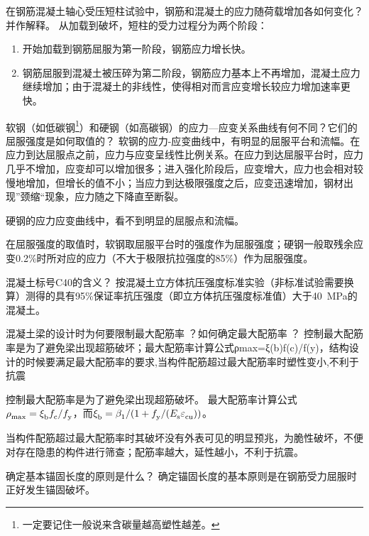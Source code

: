 \documentclass{article}
\begin{document}
\begin{questionList}
      \item 在钢筋混凝土轴心受压短柱试验中，钢筋和混凝土的应力随荷载增加各如何变化？并作解释。
      \ans 从加载到破坏，短柱的受力过程分为两个阶段：
      \begin{enumerate}
            \item 开始加载到钢筋屈服为第一阶段，钢筋应力增长快。
            \item ​钢筋屈服到混凝土被压碎为第二阶段，钢筋应力基本上不再增加，混凝土应力继续增加；由于混凝土的非线性，使得相对而言应变增长较应力增加速率更快。
      \end{enumerate}
      \item 软钢（如低碳钢\footnote{一定要记住一般说来含碳量越高塑性越差。}）和硬钢（如高碳钢）的应力—应变关系曲线有何不同？它们的屈服强度是如何取值的？
      \ans 软钢的应力-应变曲线中，有明显的屈服平台和流幅。在应力到达屈服点之前，应力与应变呈线性比例关系。在应力到达屈服平台时，应力几乎不增加，应变却可以增加很多；进入强化阶段后，应变增大，应力也会相对较慢地增加，但增长的值不小；当应力到达极限强度之后，应变迅速增加，钢材出现”颈缩“现象，应力随之下降直至断裂。
      \par 硬钢的应力应变曲线中，看不到明显的屈服点和流幅。
      \par 在屈服强度的取值时，软钢取屈服平台时的强度作为屈服强度；硬钢一般取残余应变0.2\%时所对应的应力（不大于极限抗拉强度的85\%）作为屈服强度。
      \item 混凝土标号C40的含义？
      \ans 按混凝土立方体抗压强度标准实验（非标准试验需要换算）测得的具有95\%保证率抗压强度（即立方体抗压强度标准值）大于\SI{40}{\MPa}的混凝土。
      \item 混凝土梁的设计时为何要限制最大配筋率 ？如何确定最大配筋率 ？
      \ans 控制最大配筋率是为了避免梁出现超筋破坏；最大配筋率计算公式ρmax=ξ(b)f(c)/f(y)，结构设计的时候要满足最大配筋率的要求,当构件配筋超过最大配筋率时塑性变小,不利于抗震
      \item 控制最大配筋率是为了避免梁出现超筋破坏。
      \ans 最大配筋率计算公式$\script{\rho}{max} = \script{\xi}{b} \script{f}{c} / \script{f}{y}$，而$\script{\xi}{b} = \script{\beta}{1}/(1+\script{f}{y}/(\script{E}{s}\script{\varepsilon}{cu}))$。
      \par 当构件配筋超过最大配筋率时其破坏没有外表可见的明显预兆，为脆性破坏，不便对存在隐患的构件进行筛查；配筋率越大，延性越小，不利于抗震。
      \item 确定基本锚固长度的原则是什么？
      \ans 确定锚固长度的基本原则是在钢筋受力屈服时正好发生锚固破坏。

\end{questionList}
\end{document}
